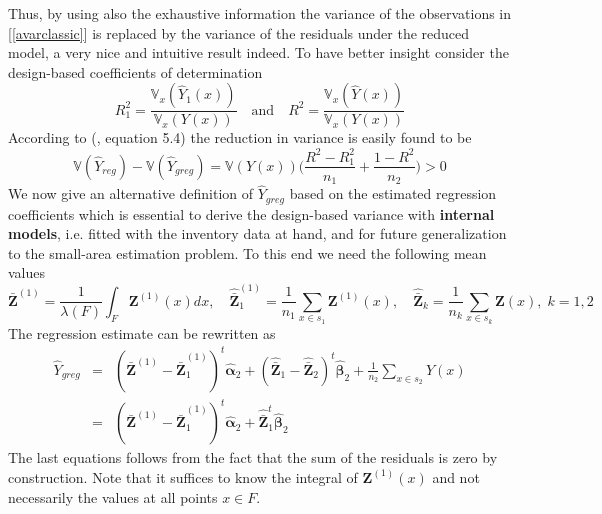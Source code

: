 \documentclass[a4paper,12pt,leqno, titlepage]{article}
\newcommand{\VAR}{\mathbb{V}}
\begin{document}
Thus, by using also the exhaustive information the variance of the observations in [\ref{avarclassic}] is replaced by the variance of the residuals under the reduced model, a very nice and intuitive result indeed. To have better insight consider the design-based coefficients of determination
\begin{equation}\label{coeffdeter}
R_1^2=\frac{\VAR_x(\hat{Y}_1(x))}{\VAR_x(Y(x))} \quad \text{and} \quad R^2=\frac{\VAR_x(\hat{Y}(x))}{\VAR_x(Y(x))}
\end{equation}
According to (\cite{mandallaz}, equation 5.4) the reduction in variance is easily found to be
\begin{equation}\label{varreduction}
\VAR(\hat{Y}_{reg})-\VAR(\hat{Y}_{greg})=\VAR(Y(x))\Big(\frac{R^2-R_1^2}{n_1}+\frac{1-R^2}{n_2}\Big)>0
\end{equation}
We now give an alternative definition of $\hat{Y}_{greg}$ based on the estimated regression coefficients which is essential to derive the design-based variance with \textbf{internal models}, i.e. fitted with the inventory data at hand, and for future generalization to the small-area estimation problem. To this end we need the following mean values
\begin{equation}\label{meanvalues}
\bar{\pmb{Z}}^{(1)}=\frac{1}{\lambda(F)}\int_F \pmb{Z}^{(1)}(x)dx ,\quad \hat{\bar{\pmb{Z}}}^{(1)}_1=\frac{1}{n_1}\sum_{x\in{s}_1}\pmb{Z}^{(1)}(x) ,
\quad \hat{\bar{\pmb{Z}}}_k=\frac{1}{n_k}\sum_{x\in{s}_k}\pmb{Z}(x),\;k=1,2
\end{equation}
The regression estimate can be rewritten as
\begin{eqnarray}\label{ygreg2}
\hat{Y}_{greg}&=&(\bar{\pmb{Z}}^{(1)}-\hat{\bar{\pmb{Z}}}^{(1)}_1)^t\hat{\pmb{\alpha}}_2 + (\hat{\bar{\pmb{Z}}}_1-\hat{\bar{\pmb{Z}}}_2)^t\hat{\pmb{\beta}}_{2}+\frac{1}{n_2}
\sum_{x\in{s}_2}Y(x) \nonumber \\
&=& (\bar{\pmb{Z}}^{(1)}-\hat{\bar{\pmb{Z}}}^{(1)}_1)^t\hat{\pmb{\alpha}}_2 +
\hat{\bar{\pmb{Z}}}^t_1\hat{\pmb{\beta}}_{2}
\end{eqnarray}
The last equations follows from the fact that the sum of the residuals is zero by construction.
Note that it suffices to know the integral of $\pmb{Z}^{(1)}(x)$ and not necessarily the values at all points $x\in{F}$.
\end{document}
